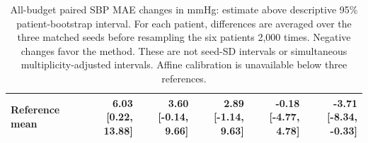 \documentclass[11pt]{article}
\begin{document}
\begin{table}[!htbp]
\begin{tabular}{lrrrrr}
Reference mean & \shortstack{6.03\\{[0.22, 13.88]}} & \shortstack{3.60\\{[-0.14, 9.66]}} & \shortstack{2.89\\{[-1.14, 9.63]}} & \shortstack{-0.18\\{[-4.77, 4.78]}} & \shortstack{-3.71\\{[-8.34, -0.33]}}\\
\bottomrule\end{tabular}
\caption{All-budget paired SBP MAE changes in mmHg: estimate above descriptive 95\% patient-bootstrap interval. For each patient, differences are averaged over the three matched seeds before resampling the six patients 2,000 times. Negative changes favor the method. These are not seed-SD intervals or simultaneous multiplicity-adjusted intervals. Affine calibration is unavailable below three references.}\end{table}
\end{document}
